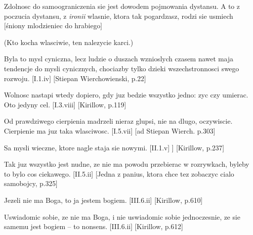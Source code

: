 \pa
Zdolnosc do samoograniczenia sie jest dowodem pojmowania dystansu. A to z
poczucia dystansu, z {\em ironii} wlasnie, ktora tak pogardzasz, rodzi sie
usmiech [\'{s}niony mlodzieniec do hrabiego]



 (Kto kocha wlasciwie, ten nalezycie karci.)


\pa
Byla to mysl cyniczna, lecz ludzie o duszach wznioslych czasem nawet maja
tendencje do mysli cynicznych, chociazby tylko dzieki wszechstronnosci  swego
rozwoju. [I.1.iv] [Stiepan Wierchowienski, p.22]

\pa
Wolnosc nastapi wtedy dopiero, gdy juz bedzie wszystko jedno: zyc czy
umierac. Oto jedyny cel. [I.3.viii] [Kirillow, p.119]

\pa
Od prawdziwego cierpienia madrzeli nieraz glupsi, nie na dlugo,
oczywiscie. Cierpienie ma juz taka wlasciwosc. [I.5.vii] [ad Stiepan
Wierch. p.303]

\pa
Sa mysli wieczne, ktore nagle staja sie nowymi. [II.1.v] ] [Kirillow, p.237]

\pa
Tak juz wszystko jest nudne, ze nie ma powodu przebierac w rozrywkach, byleby to
bylo cos ciekawego. [II.5.ii] [Jedna z panius, ktora chce tez zobaczyc cialo
samobojcy, p.325]



\pa
{}

\pa
Jezeli nie ma Boga, to ja jestem bogiem. [III.6.ii] [Kirillow, p.610]

Uswiadomic sobie, ze nie ma Boga, i nie uswiadomic sobie jednoczesnie, ze sie
samemu jest bogiem -- to nonsens. [III.6.ii] [Kirillow, p.612]


